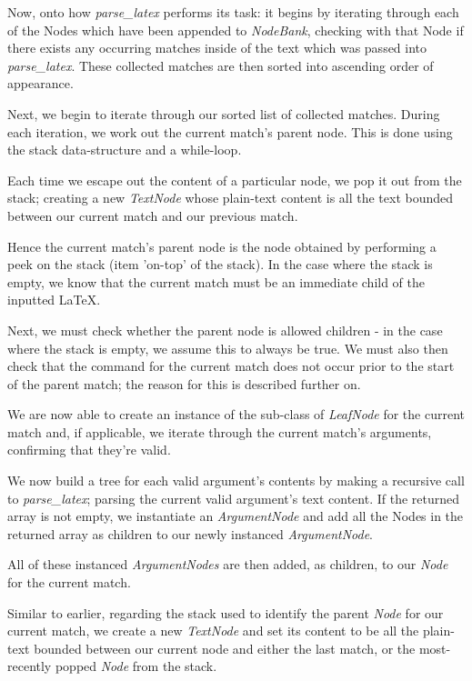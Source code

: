 		Now, onto how \textit{parse\_latex} performs its task:
		it begins by iterating through each of the Nodes which have been appended to \textit{NodeBank}, checking with that Node if there exists any occurring matches inside of the text which was passed into \textit{parse\_latex}. These collected matches are then sorted into ascending order of appearance.
		
		Next, we begin to iterate through our sorted list of collected matches.
		During each iteration, we work out the current match's parent node. This is done using the stack data-structure and a while-loop.
		
		Each time we escape out the content of a particular node, we pop it out from the stack; creating a new \textit{TextNode} whose plain-text content is all the text bounded between our current match and our previous match.
		
		Hence the current match's parent node is the node obtained by performing a peek on the stack (item 'on-top' of the stack). In the case where the stack is empty, we know that the current match must be an immediate child of the inputted \LaTeX.
		
		Next, we must check whether the parent node is allowed children - in the case where the stack is empty, we assume this to always be true. We must also then check that the command for the current match does not occur prior to the start of the parent match; the reason for this is described further on.

		We are now able to create an instance of the sub-class of \textit{LeafNode} for the current match and, if applicable, we iterate through the current match's arguments, confirming that they're valid.
		
		We now build a tree for each valid argument's contents by making a recursive call to \textit{parse\_latex}; parsing the current valid argument's text content. If the returned array is not empty, we instantiate an \textit{ArgumentNode} and add all the Nodes in the returned array as children to our newly instanced \textit{ArgumentNode}.
		
		All of these instanced \textit{ArgumentNodes} are then added, as children, to our \textit{Node} for the current match.
		
		Similar to earlier, regarding the stack used to identify the parent \textit{Node} for our current match, we create a new \textit{TextNode} and set its content to be all the plain-text bounded between our current node and either the last match, or the most-recently popped \textit{Node} from the stack.
		
